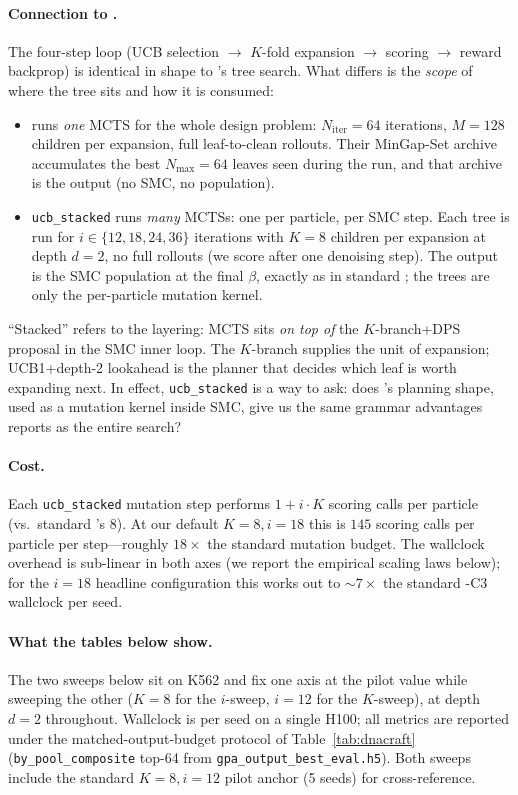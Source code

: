 \paragraph{Connection to \dnacraft{}.}
The four-step loop (UCB selection $\to$ $K$-fold expansion $\to$ scoring $\to$ reward backprop) is identical in shape to \dnacraft{}'s tree search. What differs is the \emph{scope} of where the tree sits and how it is consumed:
\begin{itemize}
\item \dnacraft{} runs \emph{one} MCTS for the whole design problem: $N_{\mathrm{iter}}\!=\!64$ iterations, $M\!=\!128$ children per expansion, full leaf-to-clean rollouts. Their MinGap-Set archive accumulates the best $N_{\max}\!=\!64$ leaves seen during the run, and that archive is the output (no SMC, no population).
\item \texttt{ucb\_stacked} runs \emph{many} MCTSs: one per particle, per SMC step. Each tree is run for $i\!\in\!\{12,18,24,36\}$ iterations with $K\!=\!8$ children per expansion at depth $d\!=\!2$, no full rollouts (we score after one denoising step). The output is the SMC population at the final $\beta$, exactly as in standard \gpa{}; the trees are only the per-particle mutation kernel.
\end{itemize}
``Stacked'' refers to the layering: MCTS sits \emph{on top of} the $K$-branch+DPS proposal in the SMC inner loop. The $K$-branch supplies the unit of expansion; UCB1+depth-2 lookahead is the planner that decides which leaf is worth expanding next. In effect, \texttt{ucb\_stacked} is a way to ask: does \dnacraft{}'s planning shape, used as a mutation kernel inside SMC, give us the same grammar advantages \dnacraft{} reports as the entire search?

\paragraph{Cost.}
Each \texttt{ucb\_stacked} mutation step performs $1\!+\!i\!\cdot\!K$ scoring calls per particle (vs.\ standard \gpa{}'s 8). At our default $K\!=\!8, i\!=\!18$ this is $145$ scoring calls per particle per step---roughly $18\!\times$ the standard \gpa{} mutation budget. The wallclock overhead is sub-linear in both axes (we report the empirical scaling laws below); for the $i\!=\!18$ headline configuration this works out to $\sim\!7\!\times$ the standard \gpa{}-C3 wallclock per seed.

\paragraph{What the tables below show.}
The two sweeps below sit on K562 and fix one axis at the pilot value while sweeping the other ($K\!=\!8$ for the $i$-sweep, $i\!=\!12$ for the $K$-sweep), at depth $d\!=\!2$ throughout. Wallclock is per seed on a single H100; all metrics are reported under the matched-output-budget protocol of Table~\ref{tab:dnacraft} (\texttt{by\_pool\_composite} top-64 from \texttt{gpa\_output\_best\_eval.h5}). Both sweeps include the standard $K\!=\!8, i\!=\!12$ pilot anchor (5 seeds) for cross-reference.

